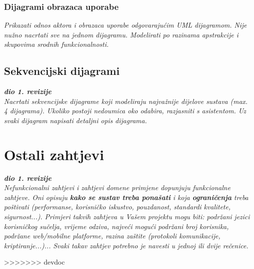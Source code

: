 					
				\subsubsection{Dijagrami obrazaca uporabe}
					
					\textit{Prikazati odnos aktora i obrazaca uporabe odgovarajućim UML dijagramom. Nije nužno nacrtati sve na jednom dijagramu. Modelirati po razinama apstrakcije i skupovima srodnih funkcionalnosti.}
				\eject		
				
			\subsection{Sekvencijski dijagrami}
				
				\textbf{\textit{dio 1. revizije}}\\
				
				\textit{Nacrtati sekvencijske dijagrame koji modeliraju najvažnije dijelove sustava (max. 4 dijagrama). Ukoliko postoji nedoumica oko odabira, razjasniti s asistentom. Uz svaki dijagram napisati detaljni opis dijagrama.}
				\eject
	
		\section{Ostali zahtjevi}
		
			\textbf{\textit{dio 1. revizije}}\\
		 
			 \textit{Nefunkcionalni zahtjevi i zahtjevi domene primjene dopunjuju funkcionalne zahtjeve. Oni opisuju \textbf{kako se sustav treba ponašati} i koja \textbf{ograničenja} treba poštivati (performanse, korisničko iskustvo, pouzdanost, standardi kvalitete, sigurnost...). Primjeri takvih zahtjeva u Vašem projektu mogu biti: podržani jezici korisničkog sučelja, vrijeme odziva, najveći mogući podržani broj korisnika, podržane web/mobilne platforme, razina zaštite (protokoli komunikacije, kriptiranje...)... Svaki takav zahtjev potrebno je navesti u jednoj ili dvije rečenice.}
			 
			 
			 
>>>>>>> devdoc
	